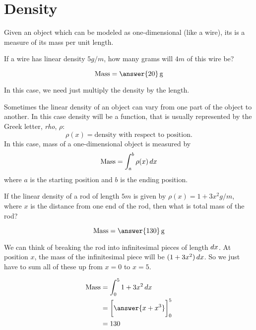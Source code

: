 \documentclass{ximera}
\begin{document}
\section{Density}

Given an object which can be modeled as one-dimensional (like a wire),
its  is a measure of its mass per unit length.

\begin{question}
  If a wire has linear density $5 \unit{g}/\unit{m}$, how many grams
  will $4 \unit{m}$ of this wire be?
  \begin{prompt}
  \[
  \mathrm{Mass} = \answer{20} \unit{g}
  \]
  \end{prompt}
  \begin{hint}
    In this case, we need just multiply the density by the length.
  \end{hint}
\end{question}

Sometimes the linear density of an object can vary from one part of
the object to another. In this case density will be a function, that
is usually represented by the Greek letter, \textit{rho}, $\rho$:
\[
\rho(x) = \text{density with respect to position.}
\]
In this case, mass of a one-dimensional object is measured by
\[
\mathrm{Mass} = \int_{a}^{b} \rho(x) \mathop{}\!d x
\]
where $a$ is the starting position and $b$ is the ending position.

\begin{question}
  If the linear density of a rod of length $5\unit{m}$ is given by
  $\rho(x) = 1+3x^2 \unit{g}/\unit{m}$, where $x$ is the distance from
  one end of the rod, then what is total mass of the rod?
  \begin{prompt}
    \[
    \mathrm{Mass} = \answer{130} \unit{g}
    \]
  \end{prompt}
  \begin{hint}
    We can think of breaking the rod into infinitesimal pieces of
    length $\mathop{}\!d x$.  At position $x$, the mass of the infinitesimal
    piece will be $(1+3x^2)\mathop{}\!d x$.  So we just have to sum all of these
    up from $x=0$ to $x=5$.
  \end{hint}
  \begin{hint}
    \begin{align*}
      \mathrm{Mass} &= \int_0^5 1+3x^2 \d x\\
      &=\eval{\answer{x+x^3}}_0^5\\
      &=130
    \end{align*}
  \end{hint}
\end{question}
\end{document}
